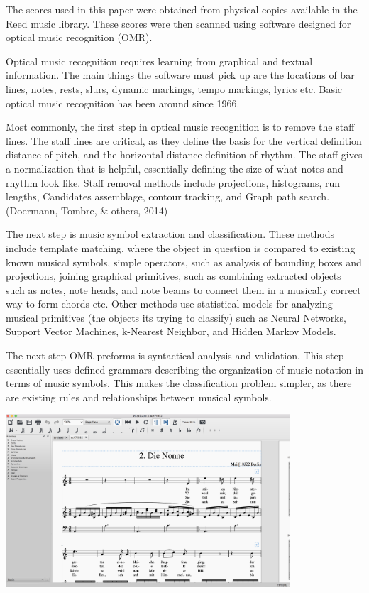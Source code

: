 \documentclass[12pt,twoside]{reedthesis}
\theoremstyle{definition}
\theoremstyle{definition}
\theoremstyle{definition}
\theoremstyle{remark}
\begin{document}
The scores used in this paper were obtained from physical copies
available in the Reed music library. These scores were then scanned
using software designed for optical music recognition (OMR).

Optical music recognition requires learning from graphical and textual
information. The main things the software must pick up are the locations
of bar lines, notes, rests, slurs, dynamic markings, tempo markings,
lyrics etc. Basic optical music recognition has been around since 1966.

Most commonly, the first step in optical music recognition is to remove
the staff lines. The staff lines are critical, as they define the basis
for the vertical definition distance of pitch, and the horizontal
distance definition of rhythm. The staff gives a normalization that is
helpful, essentially defining the size of what notes and rhythm look
like. Staff removal methods include projections, histograms, run
lengths, Candidates assemblage, contour tracking, and Graph path search.
(Doermann, Tombre, \& others, 2014)

The next step is music symbol extraction and classification. These
methods include template matching, where the object in question is
compared to existing known musical symbols, simple operators, such as
analysis of bounding boxes and projections, joining graphical
primitives, such as combining extracted objects such as notes, note
heads, and note beams to connect them in a musically correct way to form
chords etc. Other methods use statistical models for analyzing musical
primitives (the objects its trying to classify) such as Neural Networks,
Support Vector Machines, k-Nearest Neighbor, and Hidden Markov Models.

The next step OMR preforms is syntactical analysis and validation. This
step essentially uses defined grammars describing the organization of
music notation in terms of music symbols. This makes the classification
problem simpler, as there are existing rules and relationships between
musical symbols.
\begin{Shaded}
\begin{Highlighting}[]
\OperatorTok{::}\NormalTok{(}\NormalTok{)}
\end{Highlighting}
\end{Shaded}
\includegraphics[width=400px]{images/museScore}
\end{document}
